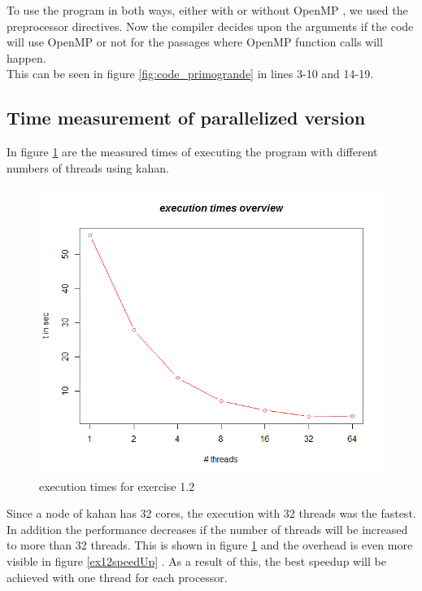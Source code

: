 \documentclass[11pt,a4paper]{article}
\begin{document}
To use the program in both ways, either with or without OpenMP , we used the preprocessor directives. Now the compiler decides upon the arguments if the code will use OpenMP or not for the passages where OpenMP function calls will happen.\\

This can be seen in figure \ref{fig:code_primogrande} in lines 3-10 and 14-19.

\pagebreak
\subsection{Time measurement of parallelized version}

In figure \ref{ex12execution} are the measured times of executing the program with different numbers of threads using kahan.\\

\begin{figure}[h]
\centering
  \includegraphics[scale=0.35]{statistics/Ex12ResultGraph.png}
	\caption{execution times for exercise 1.2}
	\label{ex12execution}
\end{figure}


Since a node of kahan has 32 cores, the execution with 32 threads was the fastest. In addition the performance decreases if the number of threads will be increased to more than 32 threads. This is shown in figure \ref{ex12execution} and the overhead is even more visible in figure \ref{ex12speedUp} .
As a result of this, the best speedup will be achieved with one thread for each processor.
\end{document}
